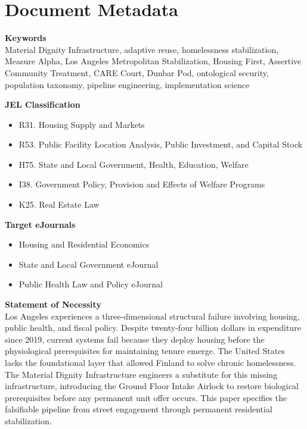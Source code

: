 \documentclass[12pt, letterpaper]{article}
\begin{document}

\newpage
\section*{Document Metadata}

{\footnotesize{}

\noindent\textbf{Keywords}\\[1pt]
Material Dignity Infrastructure, adaptive reuse, homelessness stabilization, Measure Alpha, Los Angeles Metropolitan Stabilization, Housing First, Assertive Community Treatment, CARE Court, Dunbar Pod, ontological security, population taxonomy, pipeline engineering, implementation science

\vspace{8pt}
\noindent\textbf{JEL Classification}
\begin{itemize}[nosep, before={\vspace{-8pt}}, leftmargin=2em]
    \item R31. Housing Supply and Markets
    \item R53. Public Facility Location Analysis, Public Investment, and Capital Stock
    \item H75. State and Local Government, Health, Education, Welfare
    \item I38. Government Policy, Provision and Effects of Welfare Programs
    \item K25. Real Estate Law
\end{itemize}

\vspace{8pt}
\noindent\textbf{Target eJournals}
\begin{itemize}[nosep, before={\vspace{-8pt}}, leftmargin=2em]
    \item Housing and Residential Economics
    \item State and Local Government eJournal
    \item Public Health Law and Policy eJournal
\end{itemize}

\vspace{8pt}
\noindent\textbf{Statement of Necessity}\\[1pt]
Los Angeles experiences a three-dimensional structural failure involving housing, public health, and fiscal policy. Despite twenty-four billion dollars in expenditure since 2019, current systems fail because they deploy housing before the physiological prerequisites for maintaining tenure emerge. The United States lacks the foundational layer that allowed Finland to solve chronic homelessness. The Material Dignity Infrastructure engineers a substitute for this missing infrastructure, introducing the Ground Floor Intake Airlock to restore biological prerequisites before any permanent unit offer occurs. This paper specifies the falsifiable pipeline from street engagement through permanent residential stabilization.

}

\end{document}
